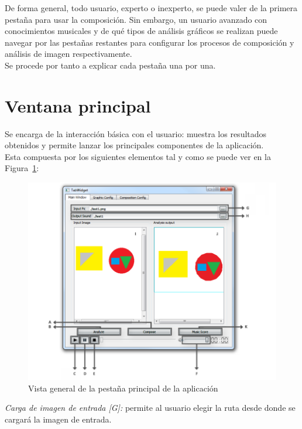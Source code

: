 		De forma general, todo usuario, experto o inexperto, se puede valer de la primera pestaña para usar la composición. Sin embargo, un usuario avanzado con conocimientos musicales y de qué tipos de análisis gráficos se realizan puede navegar por las pestañas restantes para configurar los procesos de composición y análisis de imagen respectivamente.\\
		
		Se procede por tanto a explicar cada pestaña una por una.

	\section{Ventana principal}
		
		Se encarga de la interacción básica con el usuario: muestra los resultados obtenidos y permite lanzar los principales componentes de la aplicación. 
		\\Esta compuesta por los siguientes elementos tal y como se puede ver en la Figura~\ref{fig:interfaz}:\\
		
		
		\begin{figure}[htbp]
		\centering
		\hspace*{-0.5in}
		\includegraphics[scale=0.50]{graphics/interfaz.png}
		\caption{Vista general de la pestaña principal de la aplicación}
		\label{fig:interfaz}
		\end{figure}
		
		\noindent\textit{Carga de imagen de entrada [G]:} permite al usuario elegir la ruta desde donde se cargará la imagen de entrada.\\
		
